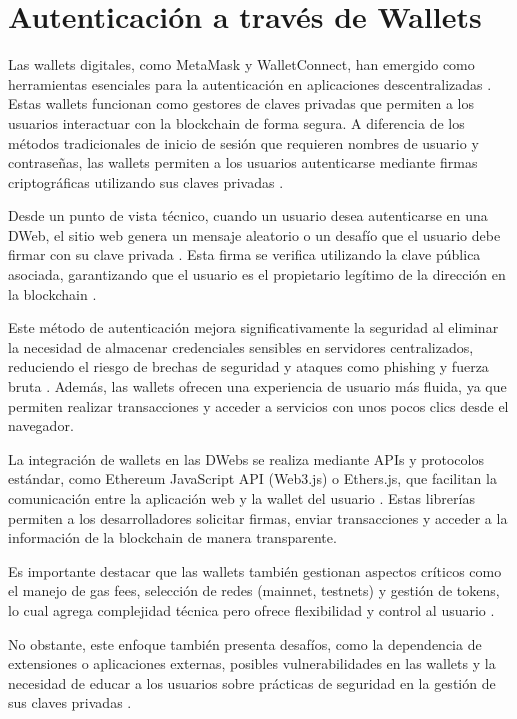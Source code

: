 \section{Autenticación a través de Wallets}

Las wallets digitales, como MetaMask y WalletConnect, han emergido como herramientas esenciales para la autenticación en aplicaciones descentralizadas \cite{metamask, walletconnect}. Estas wallets funcionan como gestores de claves privadas que permiten a los usuarios interactuar con la blockchain de forma segura. A diferencia de los métodos tradicionales de inicio de sesión que requieren nombres de usuario y contraseñas, las wallets permiten a los usuarios autenticarse mediante firmas criptográficas utilizando sus claves privadas \cite{bonneau2015sok}.

Desde un punto de vista técnico, cuando un usuario desea autenticarse en una DWeb, el sitio web genera un mensaje aleatorio o un desafío que el usuario debe firmar con su clave privada \cite{hamilton2015ethereum}. Esta firma se verifica utilizando la clave pública asociada, garantizando que el usuario es el propietario legítimo de la dirección en la blockchain \cite{kazemi2018introduction}.

Este método de autenticación mejora significativamente la seguridad al eliminar la necesidad de almacenar credenciales sensibles en servidores centralizados, reduciendo el riesgo de brechas de seguridad y ataques como phishing y fuerza bruta \cite{bonneau2015sok}. Además, las wallets ofrecen una experiencia de usuario más fluida, ya que permiten realizar transacciones y acceder a servicios con unos pocos clics desde el navegador.

La integración de wallets en las DWebs se realiza mediante APIs y protocolos estándar, como Ethereum JavaScript API (Web3.js) o Ethers.js, que facilitan la comunicación entre la aplicación web y la wallet del usuario \cite{web3js, ethersjs}. Estas librerías permiten a los desarrolladores solicitar firmas, enviar transacciones y acceder a la información de la blockchain de manera transparente.

Es importante destacar que las wallets también gestionan aspectos críticos como el manejo de gas fees, selección de redes (mainnet, testnets) y gestión de tokens, lo cual agrega complejidad técnica pero ofrece flexibilidad y control al usuario \cite{antonopoulos2018mastering}.

No obstante, este enfoque también presenta desafíos, como la dependencia de extensiones o aplicaciones externas, posibles vulnerabilidades en las wallets y la necesidad de educar a los usuarios sobre prácticas de seguridad en la gestión de sus claves privadas \cite{eskandari2018first}.

